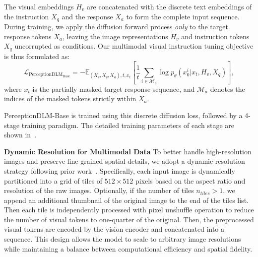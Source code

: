 \documentclass{llmxive}
\begin{document}
The visual embeddings $H_v$ are concatenated with the discrete text embeddings of the instruction $X_q$ and the response $X_a$ to form the complete input sequence. During training, we apply the diffusion forward process \emph{only} to the target response tokens $X_a$, leaving the image representations $H_v$ and instruction tokens $X_q$ uncorrupted as conditions. Our multimodal visual instruction tuning objective is thus formulated as:
\begin{equation}
    \label{eq2}
    \mathcal{L}_{\mathrm{PerceptionDLM_{Base}}} = - \mathbb{E}_{(X_v, X_q, X_a), t, x_t} \left[ \frac{1}{t} \sum_{i \in \mathcal{M}_a} \log p_\theta(x_0^i | x_t, H_v, X_q) \right],
\end{equation}
where $x_t$ is the partially masked target response sequence, and $\mathcal{M}_a$ denotes the indices of the masked tokens strictly within $X_a$. 

PerceptionDLM-Base is trained using this discrete diffusion loss, followed by a 4-stage training paradigm. The detailed training parameters of each stage are shown in~.

\noindent
\textbf{Dynamic Resolution for Multimodal Data}
To better handle high-resolution images and preserve fine-grained spatial details, we adopt a dynamic-resolution strategy following prior work~\citep{chen2024expanding}. Specifically, each input image is dynamically partitioned into a grid of tiles of $512\times512$ pixels based on the aspect ratio and resolution of the raw images. Optionally, if the number of tiles $n_{tiles} > 1$, we append an additional thumbnail of the original image to the end of the tiles list.  Then each tile is independently processed with pixel unshuffle operation to reduce the number of visual tokens to one-quarter of the original. 
%
Then, the preprocessed visual tokens are encoded by the vision encoder and concatenated into a sequence. 
%
This design allows the model to scale to arbitrary image resolutions while maintaining a balance between computational efficiency and spatial fidelity. 

%
%

%

\vspace{-2mm}
\end{document}
